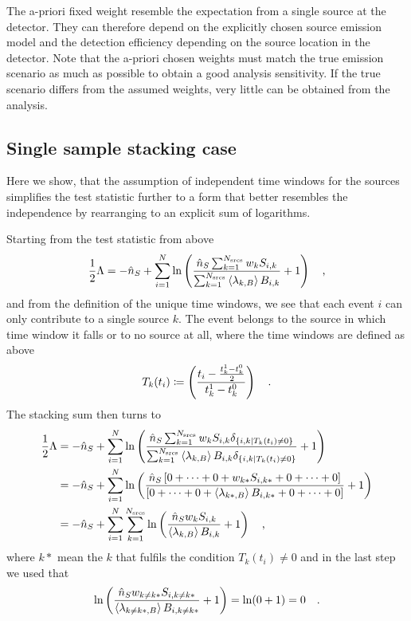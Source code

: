 The a-priori fixed weight resemble the expectation from a single source at the detector.
They can therefore depend on the explicitly chosen source emission model and the detection efficiency depending on the source location in the detector.
Note that the a-priori chosen weights must match the true emission scenario as much as possible to obtain a good analysis sensitivity.
If the true scenario differs from the assumed weights, very little can be obtained from the analysis.


\subsection{Single sample stacking case}
Here we show, that the assumption of independent time windows for the sources simplifies the test statistic further to a form that better resembles the independence by rearranging to an explicit sum of logarithms.

Starting from the test statistic from above
\begin{equation}
  \frac{1}{2}\Lambda
  = -\hat{n}_S +
    \sum_{i=1}^N \ln\left(
      \frac{\hat{n}_S \sum_{k=1}^{N_\text{srcs}} w_k S_{i,k}}
           {\sum_{k=1}^{N_\text{srcs}}\Braket{\lambda_{k,B}} B_{i,k}}
      + 1 \right)
  \quad\text{,}
\end{equation}
and from the definition of the unique time windows, we see that each event $i$ can only contribute to a single source $k$.
The event belongs to the source in which time window it falls or to no source at all, where the time windows are defined as above
\begin{equation}
  T_k(t_i) \coloneqq \left(
    \frac{t_i - \frac{t_k^1-t_k^0}{2}} {t_k^1-t_k^0}
  \right)
  \quad\text{.}
\end{equation}
The stacking sum then turns to
\begin{align}
  \frac{1}{2}\Lambda
  &= -\hat{n}_S +
    \sum_{i=1}^N \ln\left(
      \frac{\hat{n}_S \sum_{k=1}^{N_\text{srcs}} w_k S_{i,k}
            \delta_{\{i,k|T_k(t_i)\neq 0\}}}
           {\sum_{k=1}^{N_\text{srcs}}\Braket{\lambda_{k,B}} B_{i,k}
            \delta_{\{i,k|T_k(t_i)\neq 0\}}}
      + 1 \right) \\
  &= -\hat{n}_S +
    \sum_{i=1}^N \ln\left(
      \frac{\hat{n}_S \left[0+\dots+0+ w_{k*} S_{i,k*} +0+\dots+0\right]}
           {\left[0+\dots+0+ \Braket{\lambda_{k*,B}} B_{i,k*} +0+\dots+0\right]}
      + 1 \right) \\
  &= -\hat{n}_S +
    \sum_{i=1}^N \sum_{k=1}^{N_\text{srcs}} \ln\left(
      \frac{\hat{n}_S w_k S_{i,k}}{\Braket{\lambda_{k,B}} B_{i,k}}
      + 1 \right) \quad\text{,} \\
\end{align}
where $k*$ mean the $k$ that fulfils the condition $T_k(t_i)\neq 0$ and in the last step we used that
\begin{equation}
   \ln\left(
      \frac{\hat{n}_S w_{k\neq k*} S_{i,k\neq k*}}{\Braket{\lambda_{k\neq k*,B}} B_{i,k\neq k*}}
      + 1 \right) = \ln(0 + 1) = 0 \quad\text{.}
\end{equation}

